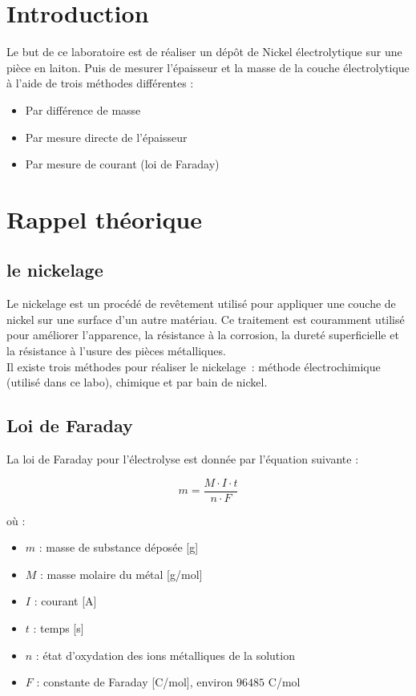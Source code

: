 \section{Introduction}
Le but de ce laboratoire est de réaliser un dépôt de Nickel électrolytique sur une pièce en laiton. Puis de mesurer l'épaisseur et la masse de la couche électrolytique à l'aide de trois méthodes différentes :

\begin{itemize}
    \item Par différence de masse
    \item Par mesure directe de l'épaisseur
    \item Par mesure de courant (loi de Faraday)
\end{itemize}

\section{Rappel théorique}
\subsection{le nickelage}

Le nickelage est un procédé de revêtement utilisé pour appliquer une couche de nickel sur une surface 
d'un autre matériau. Ce traitement est couramment utilisé pour améliorer l'apparence, la résistance
 à la corrosion, la dureté superficielle et la résistance à l'usure des pièces métalliques.\\
 Il existe trois méthodes pour réaliser le nickelage : méthode électrochimique (utilisé dans ce labo), chimique et par bain de nickel.
\subsection{Loi de Faraday}
La loi de Faraday pour l'électrolyse est donnée par l'équation suivante :

\begin{equation}\label{Equ:LoiFaraday}
m = \frac{M \cdot I \cdot t}{n \cdot F}
\end{equation}


où :

\begin{itemize}
  \item $m$ : masse de substance déposée [g]
  \item $M$ : masse molaire du métal [g/mol]
  \item $I$ : courant [A]
  \item $t$ : temps [s]
  \item $n$ : état d'oxydation des ions métalliques de la solution
  \item $F$ : constante de Faraday [C/mol], environ $96485$ C/mol
\end{itemize}

